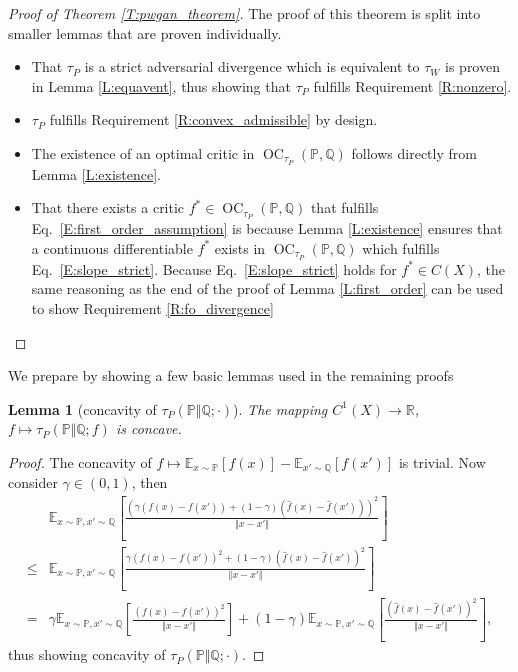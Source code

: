 \documentclass{article}
\DeclareMathOperator{\oc}{OC}
\newtheorem{lemma}{Lemma}
\begin{document}
\begin{proof}[Proof of Theorem \ref{T:pwgan_theorem}]
 The proof of this theorem is split into smaller lemmas that are proven individually.
 \begin{itemize}
  \item That $\tau_P$ is a strict adversarial divergence which is equivalent to $\tau_W$ is proven in Lemma \ref{L:equavent},
  thus showing that $\tau_P$ fulfills Requirement \ref{R:nonzero}.
  \item $\tau_P$ fulfills Requirement \ref{R:convex_admissible} by design.
  \item The existence of an optimal critic in $\oc_{\tau_P}(\mathbb P,\mathbb Q)$ follows directly from Lemma \ref{L:existence}.
  \item That there exists a critic $f^*\in\oc_{\tau_P}(\mathbb P,\mathbb Q)$ that fulfills Eq.\ \ref{E:first_order_assumption} is because
  Lemma \ref{L:existence} ensures that a continuous differentiable $f^*$ exists in $\oc_{\tau_P}(\mathbb P,\mathbb Q)$ which
  fulfills Eq.\ \ref{E:slope_strict}. Because Eq.\ \ref{E:slope_strict} holds for $f^*\in C(X)$,
  the same reasoning as the end of the proof of Lemma \ref{L:first_order} can be used to show Requirement \ref{R:fo_divergence}
 \end{itemize}
\end{proof}

We prepare by showing a few basic lemmas used in the remaining proofs

\begin{lemma}[concavity of $\tau_P(\mathbb P\Vert\mathbb Q;\cdot)$]\label{L:pen_concave}
 The mapping $C^1(X)\to\mathbb R$, $f\mapsto\tau_P(\mathbb P\Vert\mathbb Q;f)$ is concave.
 \end{lemma}

 \begin{proof}
  The concavity of $f\mapsto\mathbb E_{x\sim\mathbb P}[f(x)]-\mathbb E_{x'\sim\mathbb Q}[f(x')]$ is trivial. Now consider $\gamma\in(0,1)$, then
  \begin{align*}
   &\mathbb E_{x\sim\mathbb P,x'\sim\mathbb Q}\left[\frac{(\gamma (f(x)-f(x')) + (1-\gamma)(\hat f(x)-\hat f(x')))^2}{\Vert x-x'\Vert}\right] \\
   \leq &\mathbb E_{x\sim\mathbb P,x'\sim\mathbb Q}\left[\frac{\gamma (f(x)-f(x'))^2 + (1-\gamma)(\hat f(x)-\hat f(x'))^2}{\Vert x-x'\Vert}\right] \\
   = &\gamma\mathbb E_{x\sim\mathbb P,x'\sim\mathbb Q}\left[\frac{(f(x)-f(x'))^2}{\Vert x-x'\Vert}\right]
   +(1-\gamma)\mathbb E_{x\sim\mathbb P,x'\sim\mathbb Q}\left[\frac{(\hat f(x)-\hat f(x'))^2}{\Vert x-x'\Vert}\right],
  \end{align*}
  thus showing concavity of $\tau_P(\mathbb P\Vert\mathbb Q;\cdot)$.
 \end{proof}
\end{document}
